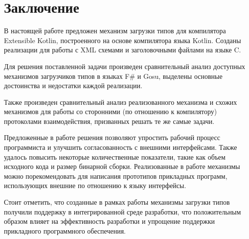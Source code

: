 \clearpage
\section*{Заключение}

В настоящей работе предложен механизм загрузки типов для компилятора Extensible Kotlin, построенного на основе компилятора языка Kotlin.
Созданы реализации для работы с XML схемами и заголовочными файлами на языке C.

Для решения поставленной задачи произведен сравнительный анализ доступных механизмов загрузчиков типов в языках
F\# и Gosu, выделены основные достоинства и недостатки каждой реализации.

Также произведен сравнительный анализ реализованного механизма и схожих механизмов для работы со сторонними
(по отношению к компилятору) протоколами взаимодействия, призванных решать те же самые задачи.

Предложенные в работе решения позволяют упростить рабочий процесс программиста и улучшить согласованность с внешними интерфейсами.
Также удалось повысить некоторые количественные показатели, такие как объем исходного кода и размер бинарной сборки.
Реализованные в работе механизмы можно порекомендовать для написания прототипов прикладных программ, использующих внешние по отношению к языку интерфейсы.

Стоит отметить, что созданные в рамках работы механизмы загрузки типов получили поддержку в интегрированной среде разработки, что положительным образом влияет на эффективность разработки и упрощение поддержки прикладного программного обеспечения.

\clearpage
